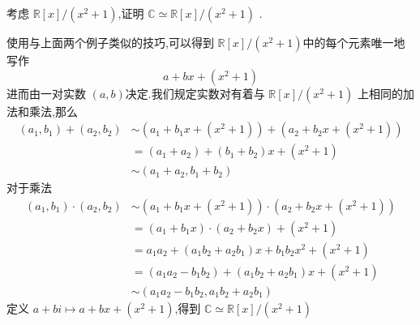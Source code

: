 \documentclass[lang=cn,12pt,color=green,fontset=none,pad]{elegantbook}
\begin{document}
\begin{example}考虑 $ \mathbb{R} [x]/\left( x^{2}+ 1 \right)  $,证明 $ \mathbb{C}\simeq  \mathbb{R} [x]/\left( x^{2}+ 1 \right)  $  .

    使用与上面两个例子类似的技巧,可以得到 $ \mathbb{R} [x]/\left( x^{2}+ 1 \right)  $中的每个元素唯一地写作 $$
    a+ bx+ \left( x^{2}+ 1 \right) 
    $$进而由一对实数 $ \left( a,b \right)  $决定.我们规定实数对有着与 $ \mathbb{R} [x]/\left( x^{2}+ 1 \right)  $   上相同的加法和乘法,那么 $$
  \begin{aligned}
    \left( a_1,b_1 \right)+ \left( a_2,b_2 \right)& \sim  \left( a_1+ b_1x+ \left( x^{2}+ 1 \right)  \right)+ \left( a_2+ b_2x+ \left( x^{2}+ 1 \right)  \right)  \\ 
     & =  \left( a_1+ a_2 \right)+ \left( b_1+ b_2 \right)x+  \left( x^{2}+ 1 \right)\\ 
      & \sim  \left( a_1+ a_2,b_1+ b_2 \right) 
  \end{aligned}  
    $$对于乘法 $$
  \begin{aligned}
    \left( a_1,b_1 \right)\cdot \left( a_2,b_2 \right)  & \sim  \left( a_1+ b_1x+ \left( x^{2}+ 1 \right)  \right)\cdot \left( a_2+ b_2x+ \left( x^{2}+ 1 \right)  \right)\\ 
     & = \left( a_1+ b_1x \right)\cdot \left( a_2+ b_2x \right)+ \left( x^{2}+ 1 \right)\\ 
      & = a_1a_2+ \left( a_1b_2+ a_2b_1 \right)x+ b_1b_2x^{2}+ \left( x^{2}+ 1 \right)\\ 
       & = \left( a_1a_{2}-b_1b_2 \right)+ \left( a_1b_2+ a_2b_1 \right)x+ \left( x^{2}+ 1 \right)           \\ 
        &\sim \left(  a_1a_2-b_1b_2,a_1b_2+ a_2b_1\right) 
  \end{aligned}
    $$定义 $ a+ bi\mapsto a+ bx+ \left( x^{2}+ 1 \right)  $,得到 $ \mathbb{C}\simeq  \mathbb{R} [x]/\left( x^{2}+ 1 \right)  $  
    
\end{example}
\end{document}
